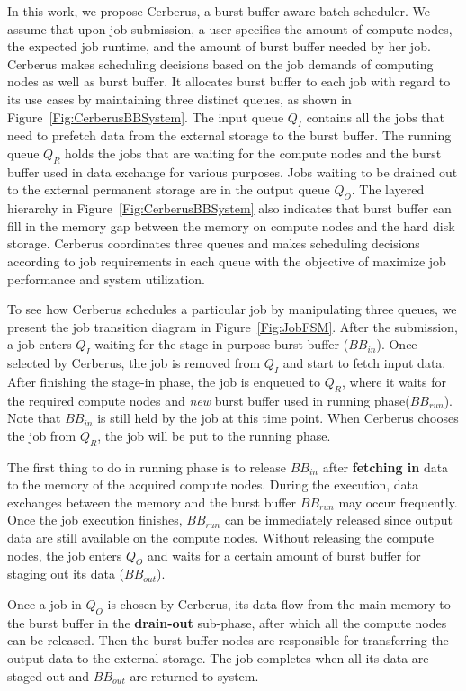 In this work,
we propose Cerberus, a burst-buffer-aware batch scheduler.
We assume that upon job submission, a user specifies the amount of compute nodes, 
the expected job runtime, and the amount of burst buffer needed by her job.
Cerberus makes scheduling decisions based on the job demands of computing nodes as well as burst buffer.
It allocates burst buffer to each job with regard to its use cases
by maintaining three distinct queues, as shown in Figure~\ref{Fig:CerberusBBSystem}.
The input queue $Q_I$ contains all the jobs that need to prefetch data
from the external storage to the burst buffer.
The running queue $Q_R$ holds the jobs that are waiting for the compute nodes and
the burst buffer used in data exchange for various purposes.
Jobs waiting to be drained out to the external permanent storage are in the output queue $Q_O$.
The layered hierarchy in Figure~\ref{Fig:CerberusBBSystem} also indicates that burst buffer
can fill in the memory gap between the memory on compute nodes and the hard disk storage.
Cerberus coordinates three queues and makes scheduling decisions according to job requirements
in each queue with the objective of maximize job performance and system utilization.

To see how Cerberus schedules a particular job by manipulating three queues,
we present the job transition diagram in Figure~\ref{Fig:JobFSM}.
After the submission, a job enters $Q_I$ waiting for the stage-in-purpose burst buffer ($BB_{in}$).
Once selected by Cerberus, the job is removed from $Q_I$ and start to fetch input data.
After finishing the stage-in phase, the job is enqueued to $Q_R$,
where it waits for the required compute nodes and \textit{new} burst buffer used in running phase($BB_{run}$).
Note that $BB_{in}$ is still held by the job at this time point.
When Cerberus chooses the job from $Q_R$, the job will be put to the running phase.

The first thing to do in running phase is to release $BB_{in}$ after
\textbf{fetching in} data to the memory of the acquired compute nodes.
During the execution, data exchanges between the memory and the burst buffer $BB_{run}$
may occur frequently.
Once the job execution finishes, $BB_{run}$ can be immediately released since
output data are still available on the compute nodes.
Without releasing the compute nodes, the job enters $Q_O$ and waits for a certain amount of burst buffer for staging out its data ($BB_{out}$).

Once a job in $Q_O$ is chosen by Cerberus, its data flow from the main memory to the burst buffer
in the \textbf{drain-out} sub-phase, after which all the compute nodes can be released.
Then the burst buffer nodes are responsible for transferring the output data to the external storage.
The job completes when all its data are staged out and $BB_{out}$ are returned to system.

